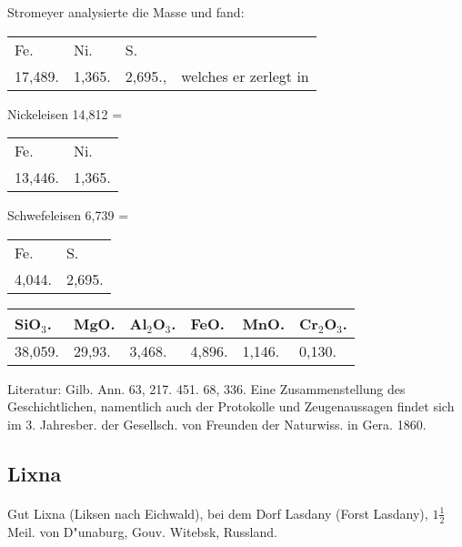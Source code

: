\documentclass[a4paper, 11pt, oneside]{article}
\begin{document}
Stromeyer analysierte die Masse und fand:
\begin{table}[!ht]
    \centering
    \begin{tabular}{l l l l}
        Fe. & Ni. & S. & \\
        17,489. & 1,365. & 2,695., & welches er zerlegt in \\
    \end{tabular}
\end{table}

\begin{center}
Nickeleisen 14,812 =
\end{center}
\begin{table}[!ht]
    \centering
    \begin{tabular}{l l}
        Fe. & Ni. \\
        13,446. & 1,365. \\
    \end{tabular}
\end{table}

\begin{center}
Schwefeleisen 6,739 =
\end{center}
\begin{table}[!ht]
    \centering
    \begin{tabular}{l l}
        Fe. & S. \\
        4,044. & 2,695. \\
    \end{tabular}
\end{table}

\begin{table}[!ht]
    \centering
    \begin{tabular}{l l l l l l}
        SiO$_{3}$. & MgO. & Al$_{2}$O$_{3}$. & FeO. & MnO. & Cr$_{2}$O$_{3}$. \\ \hline
        38,059. & 29,93. & 3,468. & 4,896. & 1,146. & 0,130. \\
    \end{tabular}
\end{table}

\footnotesize
Literatur: Gilb. Ann. 63, 217. 451. 68, 336. Eine Zusammenstellung des Geschichtlichen, namentlich auch der Protokolle und Zeugenaussagen findet sich im 3. Jahresber. der Gesellsch. von Freunden der Naturwiss. in Gera. 1860.
\subsection{Lixna}
\normalsize
\paragraph{}
Gut Lixna (Liksen nach Eichwald), bei dem Dorf Lasdany (Forst Lasdany), $1\frac{1}{2}$ Meil. von D"unaburg, Gouv. Witebsk, Russland.
\end{document}
